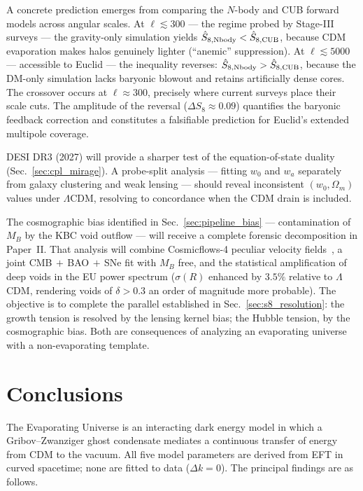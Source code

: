 \documentclass[a4paper,fleqn]{cas-dc}
\begin{document}
A concrete prediction emerges from comparing the
$N$-body and CUB forward models across angular scales.
At $\ell \lesssim 300$ --- the regime probed by
Stage-III surveys --- the gravity-only simulation
yields $\hat{S}_{8,\rm Nbody} < \hat{S}_{8,\rm CUB}$,
because CDM evaporation makes halos genuinely lighter
(``anemic'' suppression). At
$\ell \lesssim 5000$ --- accessible to Euclid ---
the inequality reverses:
$\hat{S}_{8,\rm Nbody} > \hat{S}_{8,\rm CUB}$,
because the DM-only simulation lacks baryonic blowout
and retains artificially dense cores.
The crossover occurs at $\ell \approx 300$, precisely
where current surveys place their scale cuts.
The amplitude of the reversal
($\Delta S_8 \approx 0.09$) quantifies the baryonic
feedback correction and constitutes a falsifiable
prediction for Euclid's extended multipole coverage.

DESI DR3 (2027) will provide a sharper test of the
equation-of-state duality (Sec.~\ref{sec:cpl_mirage}).
A probe-split analysis --- fitting $w_0$ and $w_a$
separately from galaxy clustering and weak lensing ---
should reveal inconsistent $(w_0, \Omega_m)$ values
under $\Lambda$CDM, resolving to concordance when the
CDM drain is included.

The cosmographic bias identified in
Sec.~\ref{sec:pipeline_bias} --- contamination of
$M_B$ by the KBC void outflow --- will receive a
complete forensic decomposition in Paper~II. That
analysis will combine Cosmicflows-4 peculiar
velocity fields~\cite{tully2023}, a joint
CMB$\,{+}\,$BAO$\,{+}\,$SNe fit with $M_B$ free, and
the statistical amplification of deep voids in the EU
power spectrum ($\sigma(R)$ enhanced by $3.5\%$
relative to $\Lambda$CDM, rendering voids of
$\delta > 0.3$ an order of magnitude more probable).
The objective is to complete the parallel established
in Sec.~\ref{sec:s8_resolution}: the growth tension
is resolved by the lensing kernel bias; the Hubble
tension, by the cosmographic bias. Both are
consequences of analyzing an evaporating universe
with a non-evaporating template.

\section{Conclusions}
\label{sec:conclusions}

The Evaporating Universe is an interacting dark energy model
in which a Gribov--Zwanziger ghost condensate mediates a
continuous transfer of energy from CDM to the vacuum. All
five model parameters are derived from EFT in curved
spacetime; none are fitted to data ($\Delta k = 0$).
The principal findings are as follows.
\end{document}
